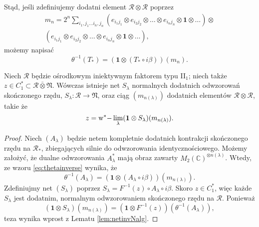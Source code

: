Stąd, jeśli zdefiniujemy dodatni element $\mathcal{R}\otimes\mathcal{R}$ poprzez
\begin{eqnarray}
m_{n} = 2^{n} \sum \limits_{i_{1}, j_{1}\ldots i_{n}, j_{n}}
\left( e_{i_{1} j_{1}} \otimes e_{i_{2} j_{2}} \otimes \ldots \otimes
e_{i_{n} j_{n}} \otimes \mathbf{1} \otimes \ldots \right) \otimes \nonumber\\
\left( e_{i_{1} j_{1}} \otimes e_{i_{2} j_{2}}\otimes \ldots \otimes
e_{i_{n} j_{n}} \otimes \mathbf{1} \otimes \ldots\right),
\end{eqnarray}
możemy napisać
\begin{equation}
\label{eq:thetainverse}
\theta^{-1}(T_{*}) =(\mathbf{1} \otimes (T_{*} \circ i \beta)) (m_{n}).
\end{equation}

\begin{Lemma}
\label{lem:netininjectivefactor}
Niech $\mathcal{R}$
będzie ośrodkowym iniektywnym faktorem typu II$\phantom{}_{1}$;
niech także $z \in C_{1}^{*} \subset \mathcal{R} \bar{\otimes} \mathfrak{N}$.
Wówczas istnieje net $S_{\lambda}$ normalnych dodatnich odwzorowań skończonego rzędu,
$S_{\lambda}: \mathcal{R} \rightarrow \mathfrak{N}$, 
oraz ciąg $(m_{n(\lambda)})$ dodatnich elementów $\mathcal{R} \otimes \mathcal{R}$,
takie że
\begin{equation}
z = {\rm w^*-} \lim \limits_{\lambda}(\mathbf{1} \otimes S_{\lambda})(m_{n(\lambda)}).
\end{equation}
\end{Lemma}
\begin{proof}
Niech $(A_{\lambda})$ będzie netem kompletnie dodatnich kontrakcji
skończonego rzędu na $\mathcal{R}_{*}$,
zbiegających silnie do odwzorowania identycznościowego.
Możemy założyć, że dualne odwzorowania $A_{\lambda}^{*}$
mają obraz zawarty $M_{2}(\mathbb{C})^{\otimes n(\lambda)}$.
Wtedy, ze wzoru \eqref{eq:thetainverse} wynika, że
\begin{equation}
\theta^{-1} (A_{\lambda}) =
( \mathbf{1} \otimes (A_{\lambda} \circ i\beta)) (m_{n(\lambda)}).
\end{equation}
Zdefiniujmy net $(S_{\lambda})$ poprzez
$S_{\lambda} = F^{-1}(z) \circ A_{\lambda} \circ i\beta$.
Skoro $z \in C_{1}^{*}$,
więc każde $S_{\lambda}$ jest dodatnim, normalnym odwzorowaniem skończonego rzędu
na $\mathcal{R}$.
Ponieważ
\begin{equation}
(\mathbf{1} \otimes S_{\lambda}) (m_{n(\lambda)}) =
(\mathbf{1} \otimes F^{-1}(z)) (\theta^{-1}(A_{\lambda})),
\end{equation}
teza wynika wprost z Lematu \ref{lem:netinvNalg}.
\end{proof}

